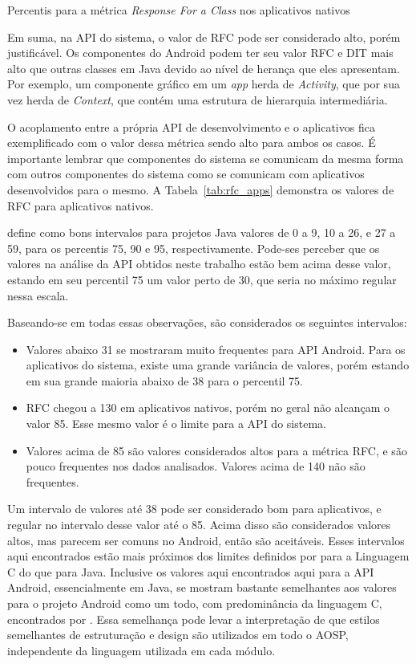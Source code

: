 \begin{table}[!htb]
\centering
{}

\caption{Percentis para a métrica \textit{Response For a Class} nos aplicativos nativos}
\label{tab:rfc_apps}
\end{table}


Em suma, na API do sistema, o valor de RFC pode ser considerado alto, porém justificável. Os componentes do Android podem ter seu valor RFC e DIT mais alto que outras classes em Java devido ao nível de herança que eles apresentam. Por exemplo, um componente gráfico em um \textit{app} herda de \textit{Activity}, que por sua vez herda de \textit{Context}, que contém uma estrutura de hierarquia intermediária.

O acoplamento entre a própria API de desenvolvimento e o aplicativos fica exemplificado com o valor dessa métrica sendo alto para ambos os casos. É importante lembrar que componentes do sistema se comunicam da mesma forma com outros componentes do sistema como se comunicam com aplicativos desenvolvidos para o mesmo. A Tabela~\ref{tab:rfc_apps} demonstra os valores de RFC para aplicativos nativos.

 define como bons intervalos para projetos Java valores de 0 a 9, 10 a 26, e 27 a 59, para os percentis 75, 90 e 95, respectivamente. Pode-ses perceber que os valores na análise da API obtidos neste trabalho estão bem acima desse valor, estando em seu percentil 75 um valor perto de 30, que seria no máximo regular nessa escala.

Baseando-se em todas essas observações, são considerados os seguintes intervalos:

\begin{itemize}
\item Valores abaixo 31 se mostraram muito frequentes para API Android. Para os aplicativos do sistema, existe uma grande variância de valores, porém estando em sua grande maioria abaixo de 38 para o percentil 75.
\item RFC chegou a 130 em aplicativos nativos, porém no geral não alcançam o valor 85. Esse mesmo valor é o limite para a API do sistema.
\item Valores acima de 85 são valores considerados altos para a métrica RFC, e são pouco frequentes nos dados analisados. Valores acima de 140 não são frequentes.
\end{itemize}

Um intervalo de valores até 38 pode ser considerado bom para aplicativos, e regular no intervalo desse valor até o 85. Acima disso são considerados valores altos, mas parecem ser comuns no Android, então são aceitáveis. Esses intervalos aqui encontrados estão mais próximos dos limites definidos por  para a Linguagem C do que para Java. Inclusive os valores aqui encontrados aqui para a API Android, essencialmente em Java, se mostram bastante semelhantes aos valores para o projeto Android como um todo, com predominância da linguagem C, encontrados por . Essa semelhança pode levar a interpretação de que estilos semelhantes de estruturação e design são utilizados em todo o AOSP, independente da linguagem utilizada em cada módulo.

